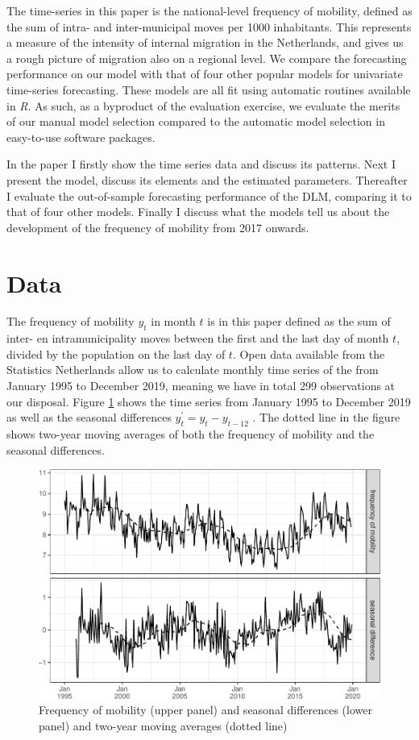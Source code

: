 \documentclass[12pt, a4paper]{article}
\begin{document}
The time-series in this paper is the national-level frequency of
mobility, defined as the sum of intra- and inter-municipal moves per
1000 inhabitants. This represents a measure of the intensity of internal
migration in the Netherlands, and gives us a rough picture of migration
also on a regional level. We compare the forecasting performance on our
model with that of four other popular models for univariate time-series
forecasting. These models are all fit using automatic routines available
in \emph{R}. As such, as a byproduct of the evaluation exercise, we
evaluate the merits of our manual model selection compared to the
automatic model selection in easy-to-use software packages.

In the paper I firstly show the time series data and discuss its
patterns. Next I present the model, discuss its elements and the
estimated parameters. Thereafter I evaluate the out-of-sample
forecasting performance of the DLM, comparing it to that of four other
models. Finally I discuss what the models tell us about the development
of the frequency of mobility from 2017 onwards.

\section{Data}\label{data}

The frequency of mobility $y_{t}$ in month $t$ is in this paper
defined as the sum of inter- en intramunicipality moves between the
first and the last day of month $t$, divided by the population on the
last day of $t$. Open data available from the Statistics Netherlands
allow us to calculate monthly time series of the from January 1995 to
December 2019, meaning we have in total 299 observations at our
disposal. Figure \ref{fig:freq-plot} shows the time series from January
1995 to December 2019 as well as the seasonal differences
$y^{'}_{t} = y_{t} - y_{t-12}$ . The dotted line in the figure shows
two-year moving averages of both the frequency of mobility and the
seasonal differences.

\begin{figure}
\caption{\label{fig:freq-plot}Frequency of mobility (upper panel) and
seasonal differences (lower panel) and two-year moving averages (dotted
line)}
\centering
\includegraphics{../figs/freq--freq-plot-1.pdf}
\end{figure}
\end{document}
